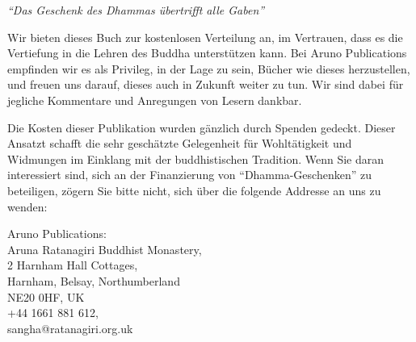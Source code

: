 {\smaller\centering


\emph{“Das Geschenk des Dhammas übertrifft alle Gaben”}\\[0.2\baselineskip]

Wir bieten dieses Buch zur kostenlosen Verteilung an, im Vertrauen, dass es die
Vertiefung in die Lehren des Buddha unterstützen kann. Bei Aruno Publications
empfinden wir es als Privileg, in der Lage zu sein, Bücher wie dieses
herzustellen, und freuen uns darauf, dieses auch in Zukunft weiter zu tun. Wir
sind dabei für jegliche Kommentare und Anregungen von Lesern dankbar.

Die Kosten dieser Publikation wurden gänzlich durch Spenden gedeckt. Dieser
Ansatzt schafft die sehr geschätzte Gelegenheit für Wohltätigkeit und Widmungen
im Einklang mit der buddhistischen Tradition. Wenn Sie daran interessiert sind,
sich an der Finanzierung von “Dhamma-Geschenken” zu beteiligen, zögern Sie bitte
nicht, sich über die folgende Addresse an uns zu wenden:

Aruno Publications:\\
Aruna Ratanagiri Buddhist Monastery,\\
2 Harnham Hall Cottages,\\
Harnham, Belsay, Northumberland\\
NE20 0HF, UK\\
+44 1661 881 612,\\
sangha@ratanagiri.org.uk

}

